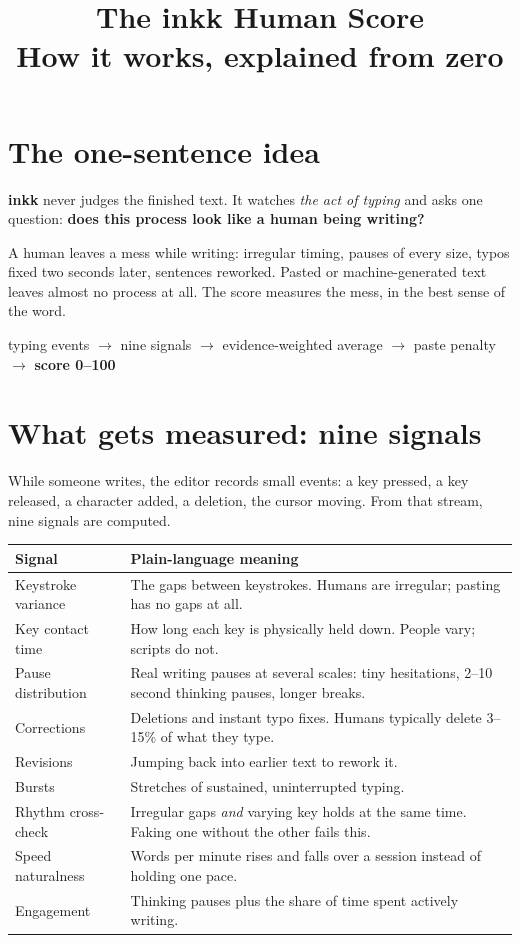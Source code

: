 \documentclass[11pt,a4paper]{article}
\title{\textbf{The inkk Human Score}\\[4pt]\large How it works, explained from zero}
\author{}
\date{}
\newcommand{\inkk}{\textbf{inkk}}
\begin{document}
\maketitle

\section*{The one-sentence idea}

\inkk{} never judges the finished text. It watches \emph{the act of typing} and asks one question: \textbf{does this process look like a human being writing?}

A human leaves a mess while writing: irregular timing, pauses of every size, typos fixed two seconds later, sentences reworked. Pasted or machine-generated text leaves almost no process at all. The score measures the mess, in the best sense of the word.

\begin{center}
typing events $\to$ nine signals $\to$ evidence-weighted average $\to$ paste penalty $\to$ \textbf{score 0--100}
\end{center}

\section{What gets measured: nine signals}

While someone writes, the editor records small events: a key pressed, a key released, a character added, a deletion, the cursor moving. From that stream, nine signals are computed.

\begin{center}
\begin{tabular}{p{4.2cm} p{9.3cm}}
\toprule
\textbf{Signal} & \textbf{Plain-language meaning} \\
\midrule
Keystroke variance & The gaps between keystrokes. Humans are irregular; pasting has no gaps at all. \\
Key contact time & How long each key is physically held down. People vary; scripts do not. \\
Pause distribution & Real writing pauses at several scales: tiny hesitations, 2--10 second thinking pauses, longer breaks. \\
Corrections & Deletions and instant typo fixes. Humans typically delete 3--15\% of what they type. \\
Revisions & Jumping back into earlier text to rework it. \\
Bursts & Stretches of sustained, uninterrupted typing. \\
Rhythm cross-check & Irregular gaps \emph{and} varying key holds at the same time. Faking one without the other fails this. \\
Speed naturalness & Words per minute rises and falls over a session instead of holding one pace. \\
Engagement & Thinking pauses plus the share of time spent actively writing. \\
\bottomrule
\end{tabular}
\end{center}
\end{document}
